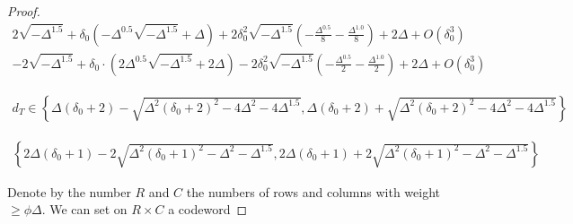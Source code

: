 \begin{proof}
\begin{equation*}
  \begin{split}
    2 \sqrt{- \Delta^{1.5}} + \delta_{0} \left(- \Delta^{0.5} \sqrt{- \Delta^{1.5}} + \Delta\right) + 2 \delta_{0}^{2} \sqrt{- \Delta^{1.5}} \left(- \frac{\Delta^{0.5}}{8} - \frac{\Delta^{1.0}}{8}\right) + 2 \Delta + O\left(\delta_{0}^{3}\right)
  \end{split}
\end{equation*}
\begin{equation*}
  \begin{split}
    - 2 \sqrt{- \Delta^{1.5}} + \delta_{0} \cdot \left(2 \Delta^{0.5} \sqrt{- \Delta^{1.5}} + 2 \Delta\right) - 2 \delta_{0}^{2} \sqrt{- \Delta^{1.5}} \left(- \frac{\Delta^{0.5}}{2} - \frac{\Delta^{1.0}}{2}\right) + 2 \Delta + O\left(\delta_{0}^{3}\right)
  \end{split}
\end{equation*}

%
%
%
%

\begin{equation*}
  \begin{split}
    d_{T} \in  \left\{\Delta \left(\delta_{0} + 2\right) - \sqrt{\Delta^{2} \left(\delta_{0} + 2\right)^{2} - 4 \Delta^{2} - 4 \Delta^{1.5}}, \Delta \left(\delta_{0} + 2\right) + \sqrt{\Delta^{2} \left(\delta_{0} + 2\right)^{2} - 4 \Delta^{2} - 4 \Delta^{1.5}}\right\}
  \end{split}
\end{equation*}

\begin{equation*}
  \begin{split}
    \left\{2 \Delta \left(\delta_{0} + 1\right) - 2 \sqrt{\Delta^{2} \left(\delta_{0} + 1\right)^{2} - \Delta^{2} - \Delta^{1.5}}, 2 \Delta \left(\delta_{0} + 1\right) + 2 \sqrt{\Delta^{2} \left(\delta_{0} + 1\right)^{2} - \Delta^{2} - \Delta^{1.5}}\right\}
  \end{split}
\end{equation*}

Denote by the number $R $ and $C$ the numbers of rows and columns with weight $\ge \phi \Delta$. We can set on $R\times C$ a codeword  
                        
                        
\end{proof}             

